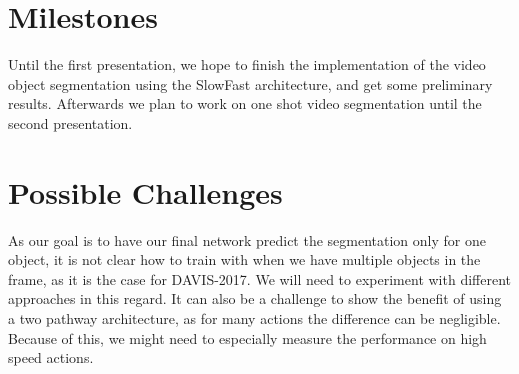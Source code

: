 \documentclass[conference]{IEEEtran}
\begin{document}
\section{Milestones}
Until the first presentation, we hope to finish the implementation of the video object segmentation using the SlowFast architecture, and get some preliminary results. Afterwards we plan to work on one shot video segmentation until the second presentation.
\section{Possible Challenges}
As our goal is to have our final network predict the segmentation only for one object, it is not clear how to train with when we have multiple objects in the frame, as it is the case for DAVIS-2017. We will need to experiment with different approaches in this regard. It can also be a challenge to show the benefit of using a two pathway architecture, as for many actions the difference can be negligible. Because of this, we might need to especially measure the performance on high speed actions.

\newpage


\end{document}
